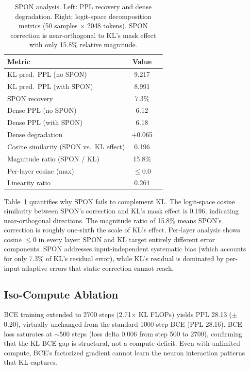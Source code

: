 \documentclass[11pt,a4paper]{article}
\begin{document}
\begin{table}[t]
\centering
\caption{SPON analysis. Left: PPL recovery and dense degradation. Right: logit-space decomposition metrics (50 samples $\times$ 2048 tokens). SPON correction is near-orthogonal to KL's mask effect with only 15.8\% relative magnitude.}
\label{tab:spon}
\small
\begin{tabular}{lcc}
\toprule
\textbf{Metric} & \textbf{Value} \\
\midrule
KL pred.\ PPL (no SPON) & 9.217 \\
KL pred.\ PPL (with SPON) & 8.991 \\
SPON recovery & 7.3\% \\
Dense PPL (no SPON) & 6.12 \\
Dense PPL (with SPON) & 6.18 \\
Dense degradation & +0.065 \\
\midrule
Cosine similarity (SPON vs.\ KL effect) & 0.196 \\
Magnitude ratio (SPON / KL) & 15.8\% \\
Per-layer cosine (max) & $\leq$0.0 \\
Linearity ratio & 0.264 \\
\bottomrule
\end{tabular}
\end{table}

Table~\ref{tab:spon} quantifies why SPON fails to complement KL. The logit-space cosine similarity between SPON's correction and KL's mask effect is 0.196, indicating near-orthogonal directions. The magnitude ratio of 15.8\% means SPON's correction is roughly one-sixth the scale of KL's effect. Per-layer analysis shows cosine $\leq$0 in every layer: SPON and KL target entirely different error components. SPON addresses input-independent systematic bias (which accounts for only 7.3\% of KL's residual error), while KL's residual is dominated by per-input adaptive errors that static correction cannot reach.

\subsection{Iso-Compute Ablation}

BCE training extended to 2700 steps (2.71$\times$ KL FLOPs) yields PPL 28.13 ($\pm$0.20), virtually unchanged from the standard 1000-step BCE (PPL 28.16). BCE loss saturates at ${\sim}$500 steps (loss delta 0.006 from step 500 to 2700), confirming that the KL-BCE gap is structural, not a compute deficit. Even with unlimited compute, BCE's factorized gradient cannot learn the neuron interaction patterns that KL captures.
\end{document}
